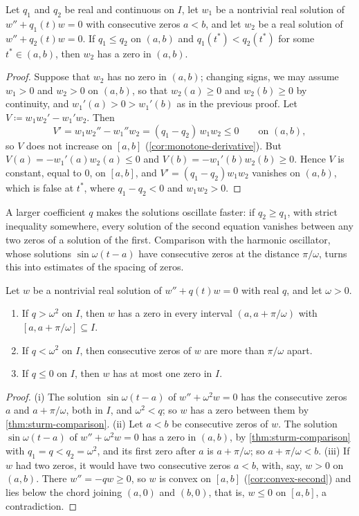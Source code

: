 \begin{theorem}
\label{thm:sturm-comparison}
Let $q_1$ and $q_2$ be real and continuous on $I$, let $w_1$ be a nontrivial real solution of $w''+q_1(t)w=0$ with consecutive zeros $a<b$, and let $w_2$ be a real solution of $w''+q_2(t)w=0$. If $q_1\le q_2$ on $(a,b)$ and $q_1(t^*)<q_2(t^*)$ for some $t^*\in(a,b)$, then $w_2$ has a zero in $(a,b)$.
\end{theorem}

\begin{proof}
Suppose that $w_2$ has no zero in $(a,b)$; changing signs, we may assume $w_1>0$ and $w_2>0$ on $(a,b)$, so that $w_2(a)\ge0$ and $w_2(b)\ge0$ by continuity, and $w_1'(a)>0>w_1'(b)$ as in the previous proof. Let $V\coloneqq w_1w_2'-w_1'w_2$. Then
\[
V'=w_1w_2''-w_1''w_2=(q_1-q_2)\,w_1w_2\le0\qquad\text{on }(a,b),
\]
so $V$ does not increase on $[a,b]$ (\cref{cor:monotone-derivative}). But $V(a)=-w_1'(a)w_2(a)\le0$ and $V(b)=-w_1'(b)w_2(b)\ge0$. Hence $V$ is constant, equal to $0$, on $[a,b]$, and $V'=(q_1-q_2)w_1w_2$ vanishes on $(a,b)$, which is false at $t^*$, where $q_1-q_2<0$ and $w_1w_2>0$.
\end{proof}

A larger coefficient $q$ makes the solutions oscillate faster: if $q_2\ge q_1$, with strict inequality somewhere, every solution of the second equation vanishes between any two zeros of a solution of the first. Comparison with the harmonic oscillator, whose solutions $\sin\omega(t-a)$ have consecutive zeros at the distance $\pi/\omega$, turns this into estimates of the spacing of zeros.

\begin{corollary}
\label{cor:zero-spacing}
Let $w$ be a nontrivial real solution of $w''+q(t)w=0$ with real $q$, and let $\omega>0$.
\begin{enumerate}
\item If $q>\omega^2$ on $I$, then $w$ has a zero in every interval $(a,a+\pi/\omega)$ with $[a,a+\pi/\omega]\subseteq I$.
\item If $q<\omega^2$ on $I$, then consecutive zeros of $w$ are more than $\pi/\omega$ apart.
\item If $q\le0$ on $I$, then $w$ has at most one zero in $I$.
\end{enumerate}
\end{corollary}

\begin{proof}
(i) The solution $\sin\omega(t-a)$ of $w''+\omega^2w=0$ has the consecutive zeros $a$ and $a+\pi/\omega$, both in $I$, and $\omega^2<q$; so $w$ has a zero between them by \cref{thm:sturm-comparison}. (ii) Let $a<b$ be consecutive zeros of $w$. The solution $\sin\omega(t-a)$ of $w''+\omega^2w=0$ has a zero in $(a,b)$, by \cref{thm:sturm-comparison} with $q_1=q<q_2=\omega^2$, and its first zero after $a$ is $a+\pi/\omega$; so $a+\pi/\omega<b$. (iii) If $w$ had two zeros, it would have two consecutive zeros $a<b$, with, say, $w>0$ on $(a,b)$. There $w''=-qw\ge0$, so $w$ is convex on $[a,b]$ (\cref{cor:convex-second}) and lies below the chord joining $(a,0)$ and $(b,0)$, that is, $w\le0$ on $[a,b]$, a contradiction.
\end{proof}

